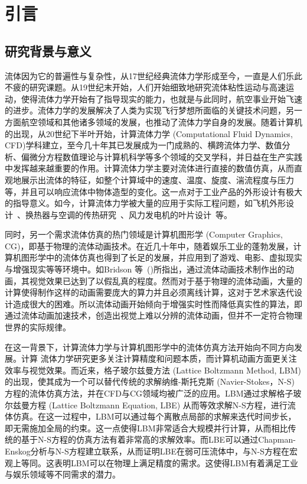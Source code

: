 \chapter{引言}

\section{研究背景与意义}
流体因为它的普遍性与复杂性，从17世纪经典流体力学形成至今，一直是人们乐此不疲的研究课题。从19世纪末开始，人们开始细致地研究流体粘性运动与高速运动，使得流体力学开始有了指导现实的能力，也就是与此同时，航空事业开始飞速的进步。流体力学的发展解决了人类为实现飞行梦想所面临的关键技术问题，另一方面航空领域和其他诸多领域的发展，也推动了流体力学自身的发展。随着计算机的出现，从20世纪下半叶开始，计算流体力学 (Computational Fluid Dynamics, CFD)学科建立，至今几十年其已发展成为一门成熟的、横跨流体力学、数值分析、偏微分方程数值理论与计算机科学等多个领域的交叉学科，并日益在生产实践中发挥越来越重要的作用。计算流体力学主要对流体进行直接的数值仿真，从而直观地展示出流体的特征，如整个计算域中的速度、温度、旋度、湍流程度与压力等，并且可以响应流体中物体造型的变化。这一点对于工业产品的外形设计有极大的指导意义。如今，计算流体力学被大量的应用于实际工程问题，如飞机外形设计~\cite{JOHNSON20051115}、换热器与空调的传热研究~\cite{ASLAMBHUTTA20121}、风力发电机的叶片设计~\cite{Shourangiz-Haghighi2020-mo}等。

同时，另一个需求流体仿真的热门领域是计算机图形学 (Computer Graphics, CG)，即基于物理的流体动画技术。在近几十年中，随着娱乐工业的蓬勃发展，计算机图形学中的流体仿真也得到了长足的发展，并应用到了游戏、电影、虚拟现实与增强现实等等环境中。如Bridson 等~(\citeyear{doi:10.1126/science.1198769})所指出，通过流体动画技术制作出的动画，其视觉效果已达到了以假乱真的程度。然而对于基于物理的流体动画，大量的计算使得制作这样的动画需要庞大的算力并且必须离线计算，这对于艺术家迭代设计造成很大的困难。所以流体动画开始倾向于增强实时性而降低真实性的算法，即通过流体动画加速技术，创造出视觉上难以分辨的流体动画，但并不一定符合物理世界的实际规律。

在这一背景下，计算流体力学与计算机图形学中的流体仿真方法开始向不同方向发展。计算
流体力学研究更多关注计算精度和问题本质，而计算机动画方面更关注效率与视觉效果。而近来，格子玻尔兹曼方法 (Lattice Boltzmann Method, LBM) 的出现，使其成为一个可以替代传统的求解纳维-斯托克斯 (Navier-Stokes，N-S) 方程的流体仿真方法，并在CFD与CG领域均被广泛的应用。LBM通过求解格子玻尔兹曼方程 (Lattice Boltzmann Equation, LBE) 从而等效求解N-S方程，进行流体仿真。在这一过程中，LBM可以通过每个离散点局部的求解来迭代时间步长，即无需施加全局的约束。这一点使得LBM非常适合大规模并行计算，从而相比传统的基于N-S方程的仿真方法有着非常高的求解效率。而LBE可以通过Chapman-Enskog分析与N-S方程建立联系，从而证明LBE在弱可压流体中，与N-S方程在宏观上等同\cite{Y.H.Qian_1993}。这表明LBM可以在物理上满足精度的需求。这使得LBM有着满足工业与娱乐领域等不同需求的潜力。

